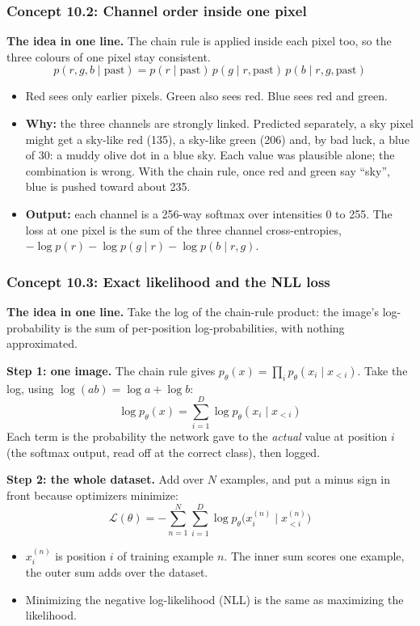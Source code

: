 \documentclass[12pt,a4paper]{article}
\begin{document}
\subsubsection{Concept 10.2: Channel order inside one pixel}\label{c10-2}

\textbf{The idea in one line.} The chain rule is applied inside each pixel too, so the three colours of one pixel stay consistent.
\[
p(r,g,b\mid\text{past})=p(r\mid\text{past})\,p(g\mid r,\text{past})\,p(b\mid r,g,\text{past})
\]
\begin{itemize}[nosep]
  \item Red sees only earlier pixels. Green also sees red. Blue sees red and green.
  \item \textbf{Why:} the three channels are strongly linked. Predicted separately, a sky pixel might get a sky-like red (135), a sky-like green (206) and, by bad luck, a blue of 30: a muddy olive dot in a blue sky. Each value was plausible alone; the combination is wrong. With the chain rule, once red and green say ``sky'', blue is pushed toward about 235.
  \item \textbf{Output:} each channel is a 256-way softmax over intensities 0 to 255. The loss at one pixel is the sum of the three channel cross-entropies, $-\log p(r)-\log p(g\mid r)-\log p(b\mid r,g)$.
\end{itemize}

\subsubsection{Concept 10.3: Exact likelihood and the NLL loss}\label{c10-3}

\textbf{The idea in one line.} Take the log of the chain-rule product: the image's log-probability is the sum of per-position log-probabilities, with nothing approximated.

\textbf{Step 1: one image.} The chain rule gives $p_\theta(x)=\prod_ip_\theta(x_i\mid x_{<i})$. Take the log, using $\log(ab)=\log a+\log b$:
\[
\log p_\theta(x)=\sum_{i=1}^{D}\log p_\theta(x_i\mid x_{<i})
\]
Each term is the probability the network gave to the \emph{actual} value at position $i$ (the softmax output, read off at the correct class), then logged.

\textbf{Step 2: the whole dataset.} Add over $N$ examples, and put a minus sign in front because optimizers minimize:
\[
\mathcal{L}(\theta)=-\sum_{n=1}^{N}\sum_{i=1}^{D}\log p_\theta\big(x_i^{(n)}\mid x_{<i}^{(n)}\big)
\]
\begin{itemize}[nosep]
  \item $x_i^{(n)}$ is position $i$ of training example $n$. The inner sum scores one example, the outer sum adds over the dataset.
  \item Minimizing the negative log-likelihood (NLL) is the same as maximizing the likelihood.
\end{itemize}
\end{document}
